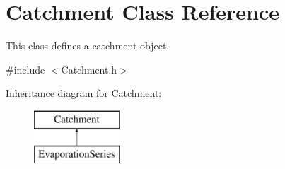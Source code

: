 \hypertarget{classCatchment}{}\section{Catchment Class Reference}
\label{classCatchment}


This class defines a catchment object.  




{\ttfamily \#include $<$Catchment.\+h$>$}

Inheritance diagram for Catchment\+:\begin{figure}[H]
\begin{center}
\leavevmode
\includegraphics[height=2.000000cm]{classCatchment}
\end{center}
\end{figure}
